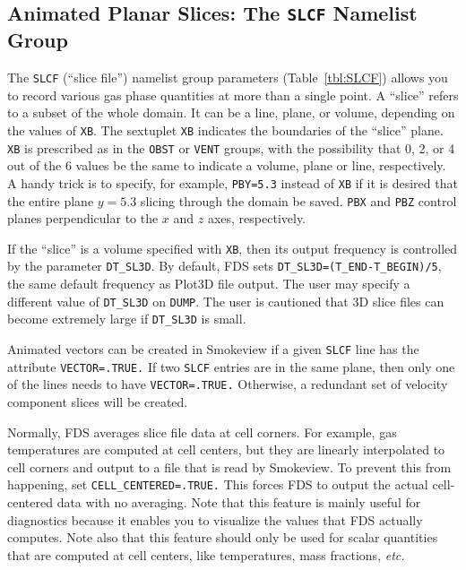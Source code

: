 \documentclass[11pt]{book}
\newcommand{\ct}{\tt\small}
\begin{document}
\subsection{Animated Planar Slices: The \texorpdfstring{{\tt SLCF}}{SLCF} Namelist Group}
\label{info:SLCF}

The {\ct SLCF} (``slice file'') namelist group parameters (Table~\ref{tbl:SLCF})
allows you to record various gas phase quantities
at more than a single point. A ``slice'' refers to a subset of the whole domain. It can be a line,
plane, or volume, depending on the values of {\ct XB}.
The sextuplet {\ct XB} indicates the boundaries of the ``slice'' plane.
{\ct XB} is prescribed as in the {\ct OBST} or {\ct VENT} groups, with
the possibility that 0, 2, or 4 out of the 6 values be the same to
indicate a volume, plane or line, respectively. A handy trick is to
specify, for example, {\ct PBY=5.3} instead of {\ct XB} if it is desired
that the entire plane $y=5.3$ slicing through the domain be saved.
{\ct PBX} and {\ct PBZ} control planes perpendicular to the
$x$ and $z$ axes, respectively.

If the ``slice'' is a volume specified with {\ct XB}, then its output frequency is controlled by the parameter {\ct DT\_SL3D}.  By default, FDS sets {\ct DT\_SL3D=(T\_END-T\_BEGIN)/5}, the same default frequency as Plot3D file output.  The user may specify a different value of {\ct DT\_SL3D} on {\ct DUMP}.  The user is cautioned that 3D slice files can become extremely large if {\ct DT\_SL3D} is small.

Animated vectors can be created in Smokeview if a given {\ct SLCF} line has the attribute {\ct VECTOR=.TRUE.} If two {\ct SLCF}
entries are in the same plane, then only one of the lines needs to have {\ct VECTOR=.TRUE.} Otherwise, a redundant set of velocity
component slices will be created.

Normally, FDS averages slice file data at cell corners. For example, gas temperatures are computed at cell centers, but they
are linearly interpolated to cell corners and output to a file that is read by Smokeview. To prevent this from happening,
set {\ct CELL\_CENTERED=.TRUE.} This forces FDS to output the actual cell-centered data with no averaging. Note that this
feature is mainly useful for diagnostics because it enables you to visualize the values that FDS actually computes. Note also that this
feature should only be used for scalar quantities that are computed at cell centers, like temperatures, mass fractions, {\em etc.}
\end{document}
